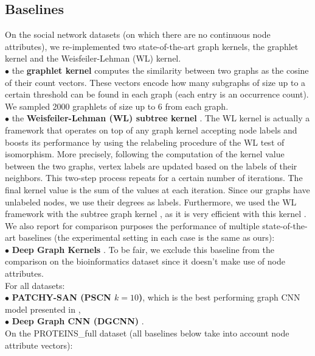 \documentclass[sigconf]{acmart}
\begin{document}
\subsection{Baselines} %
On the social network datasets (on which there are no continuous node attributes), we re-implemented two state-of-the-art graph kernels, the graphlet kernel and the Weisfeiler-Lehman (WL) kernel. \\
\noindent $\bullet$ the \textbf{graphlet kernel} \citep{shervashidze2009efficient} computes the similarity between two graphs as the cosine of their count vectors. These vectors encode how many subgraphs of size up to a certain threshold can be found in each graph (each entry is an occurrence count). We sampled 2000 graphlets of size up to 6 from each graph. \\
\noindent $\bullet$ the \textbf{Weisfeiler-Lehman (WL) subtree kernel} \citep{shervashidze2011weisfeiler}. The WL kernel is actually a framework that operates on top of any graph kernel accepting node labels and boosts its performance by using the relabeling procedure of the WL test of isomorphism. More precisely, following the computation of the kernel value between the two graphs, vertex labels are updated based on the labels of their neighbors. This two-step process repeats for a certain number of iterations. The final kernel value is the sum of the values at each iteration. Since our graphs have unlabeled nodes, we use their degrees as labels. Furthermore, we used the WL framework with the subtree graph kernel \citep{gartner2003graph}, as it is very efficient with this kernel \citep{shervashidze2011weisfeiler}. \\
We also report for comparison purposes the performance of multiple state-of-the-art baselines (the experimental setting in each case is the same as ours): \\
\noindent $\bullet$ \textbf{Deep Graph Kernels} \cite{yanardag2015deep}. To be fair, we exclude this baseline from the comparison on the bioinformatics dataset since it doesn't make use of node attributes. \\
For all datasets: \\ \noindent $\bullet$ \textbf{PATCHY-SAN (PSCN $k=10$)}, which is the best performing graph CNN model presented in \cite{niepert2016learning},\\
\noindent $\bullet$ \textbf{Deep Graph CNN (DGCNN)} \cite{zhang2018end}. \\
On the PROTEINS\_full dataset (all baselines below take into account node attribute vectors):\\
\end{document}
